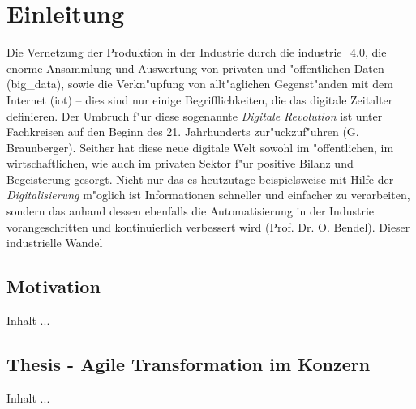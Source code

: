 
\chapter{Einleitung}
\minitoc
\vspace{1 cm} 

Die Vernetzung der Produktion in der Industrie durch die \gls{industrie_4.0}, die enorme 
Ansammlung und Auswertung von privaten und "offentlichen Daten (\gls{big_data}), sowie die 
Verkn"upfung von allt"aglichen Gegenst"anden mit dem Internet (\gls{iot}) -- dies sind nur
 einige Begrifflichkeiten, die das digitale Zeitalter definieren. Der Umbruch f"ur diese 
 sogenannte \textit{Digitale Revolution} ist unter Fachkreisen auf den Beginn des 21. 
 Jahrhunderts zur"uckzuf"uhren \cite{qeins} (G. Braunberger). Seither hat diese neue digitale 
 Welt sowohl im "offentlichen, im wirtschaftlichen, wie auch im privaten Sektor f"ur positive Bilanz 
 und Begeisterung gesorgt. Nicht nur das es heutzutage beispielsweise mit Hilfe der 
 \textit{Digitalisierung} m"oglich ist Informationen schneller und einfacher zu verarbeiten, 
 sondern das anhand dessen ebenfalls die Automatisierung in der Industrie vorangeschritten 
 und kontinuierlich verbessert wird \cite{qzwei} (Prof. Dr. O. Bendel). Dieser industrielle Wandel 

\section{Motivation}
Inhalt ...

\section{Thesis - Agile Transformation im Konzern}
Inhalt ...



